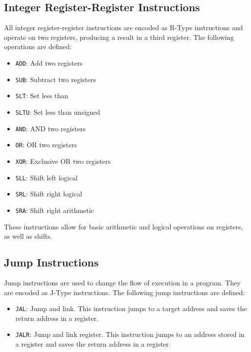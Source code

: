 \documentclass[sigconf]{acmart}
\begin{document}
\subsection{Integer Register-Register Instructions}
All integer register-register instructions are encoded as R-Type instructions and operate on two registers, producing a result in a third register. The following operations are defined:
\begin{itemize}
    \item \texttt{ADD}: Add two registers
    \item \texttt{SUB}: Subtract two registers
    \item \texttt{SLT}: Set less than
    \item \texttt{SLTU}: Set less than unsigned
    \item \texttt{AND}: AND two registers
    \item \texttt{OR}: OR two registers
    \item \texttt{XOR}: Exclusive OR two registers
    \item \texttt{SLL}: Shift left logical
    \item \texttt{SRL}: Shift right logical
    \item \texttt{SRA}: Shift right arithmetic
\end{itemize}
These instructions allow for basic arithmetic and logical operations on registers, as well as shifts. \cite{riscv-spec}

\subsection{Jump Instructions}
Jump instructions are used to change the flow of execution in a program. They are encoded as J-Type instructions.
The following jump instructions are defined:
\begin{itemize}
    \item \texttt{JAL}: Jump and link. This instruction jumps to a target address and saves the return address in a register.
    \item \texttt{JALR}: Jump and link register. This instruction jumps to an address stored in a register and saves the return address in a register.
\end{itemize}
\cite{riscv-spec}
\end{document}
